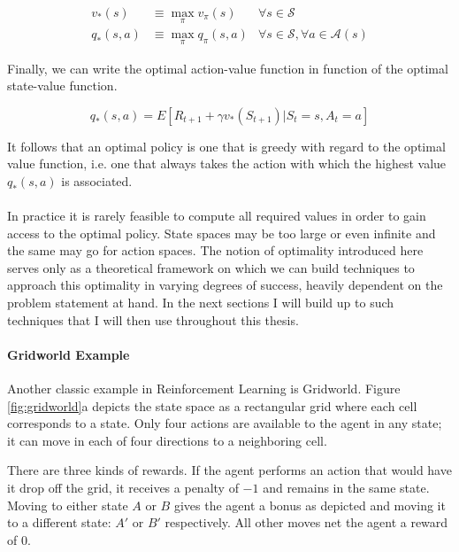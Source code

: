\begin{align*}
  \label{eq:bellman}
  v_*(s) &\equiv \max_{\pi} v_\pi(s) & \forall s \in \mathcal{S} \\
  q_*(s, a) &\equiv \max_\pi q_\pi(s,a) & \forall s \in \mathcal{S},
  \forall a \in \mathcal{A}(s)
\end{align*}

Finally, we can write the optimal action-value function
in function of the optimal state-value function.

\begin{equation}
  q_*(s,a) = E[R_{t+1} + \gamma v_*(S_{t+1}) | S_t = s, A_t = a]
\end{equation}

It follows that an optimal policy is one that is greedy
with regard to the optimal value function,
i.e. one that always takes the action
with which the highest value $q_*(s,a)$ is associated.

\paragraph{}
In practice it is rarely feasible to compute all required values
in order to gain access to the optimal policy.
State spaces may be too large or even infinite
and the same may go for action spaces.
The notion of optimality introduced here serves only as a theoretical framework
on which we can build techniques to approach this optimality
in varying degrees of success,
heavily dependent on the problem statement at hand.
In the next sections I will build up to such techniques
that I will then use throughout this thesis.

\paragraph{Gridworld Example}
\label{par:gridworld}
Another classic example in Reinforcement Learning is Gridworld.
Figure \ref{fig:gridworld}a depicts the state space
as a rectangular grid where each cell corresponds to a state.
Only four actions are available to the agent in any state;
it can move in each of four directions to a neighboring cell.

There are three kinds of rewards.
If the agent performs an action that would have it drop off the grid,
it receives a penalty of $-1$ and remains in the same state.
Moving to either state $A$ or $B$ gives the agent a bonus as depicted
and moving it to a different state: $A'$ or $B'$ respectively.
All other moves net the agent a reward of $0$.

